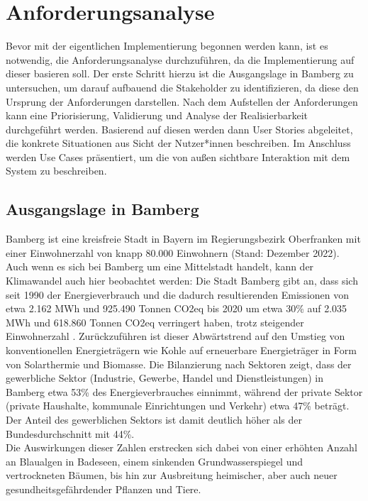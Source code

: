 \chapter{Anforderungsanalyse}
\label{sec:requirements}
Bevor mit der eigentlichen Implementierung begonnen werden kann, ist es notwendig, die Anforderungsanalyse durchzuführen, da die Implementierung auf dieser basieren soll. Der erste Schritt hierzu ist die Ausgangslage in Bamberg zu untersuchen, um darauf aufbauend die Stakeholder zu identifizieren, da diese den Ursprung der Anforderungen darstellen. Nach dem Aufstellen der Anforderungen kann eine Priorisierung, Validierung und Analyse der Realisierbarkeit durchgeführt werden. Basierend auf diesen werden dann User Stories abgeleitet, die konkrete Situationen aus Sicht der Nutzer*innen beschreiben. Im Anschluss werden Use Cases präsentiert, um die von außen sichtbare Interaktion mit dem System zu beschreiben.

\section{Ausgangslage in Bamberg}
\label{sec:ausgangslage}
Bamberg ist eine kreisfreie Stadt in Bayern im Regierungsbezirk Oberfranken mit einer Einwohnerzahl von knapp 80.000 Einwohnern (Stand: Dezember 2022). Auch wenn es sich bei Bamberg um eine Mittelstadt handelt, kann der Klimawandel auch hier beobachtet werden: Die Stadt Bamberg gibt an, dass sich seit 1990 der Energieverbrauch und die dadurch resultierenden Emissionen von etwa 2.162 MWh und 925.490 Tonnen CO2eq bis 2020 um etwa 30\% auf 2.035 MWh und 618.860 Tonnen CO2eq verringert haben, trotz steigender Einwohnerzahl \cite{Wehner2016}. Zurückzuführen ist dieser Abwärtstrend auf den Umstieg von konventionellen Energieträgern wie Kohle auf erneuerbare Energieträger in Form von Solarthermie und Biomasse. Die Bilanzierung nach Sektoren zeigt, dass der gewerbliche Sektor (Industrie, Gewerbe, Handel und Dienstleistungen) in Bamberg etwa 53\% des Energieverbrauches einnimmt, während der private Sektor (private Haushalte, kommunale Einrichtungen und Verkehr) etwa 47\% beträgt. Der Anteil des gewerblichen Sektors ist damit deutlich höher als der Bundesdurchschnitt mit 44\%. \\ Die Auswirkungen dieser Zahlen erstrecken sich dabei von einer erhöhten Anzahl an Blaualgen in Badeseen, einem sinkenden Grundwasserspiegel und vertrockneten Bäumen, bis hin zur Ausbreitung heimischer, aber auch neuer gesundheitsgefährdender Pflanzen und Tiere. 

